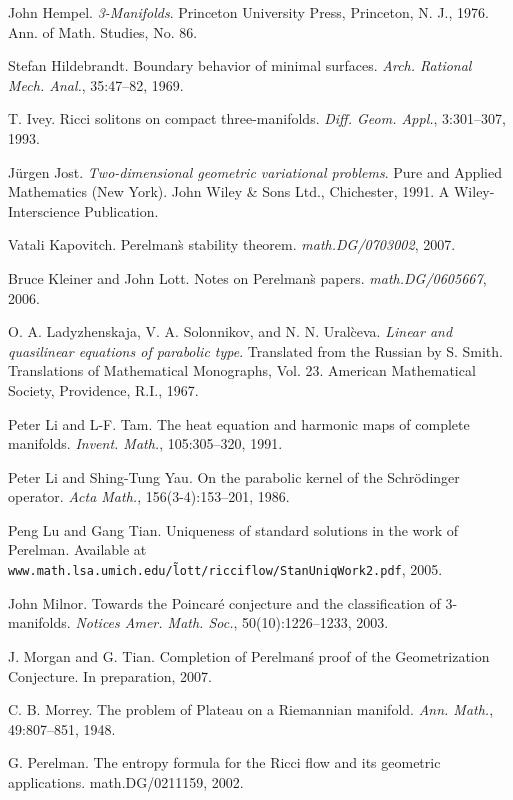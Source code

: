 \begin{thebibliography}{99}
    John Hempel. \textit{3-Manifolds}. Princeton University Press, Princeton, N. J., 1976. Ann. of Math. Studies, No. 86.

    Stefan Hildebrandt. Boundary behavior of minimal surfaces. \textit{Arch. Rational Mech. Anal.}, 35:47–82, 1969.

    T. Ivey. Ricci solitons on compact three-manifolds. \textit{Diff. Geom. Appl.}, 3:301–307, 1993.

    Jürgen Jost. \textit{Two-dimensional geometric variational problems}. Pure and Applied Mathematics (New York). John Wiley \& Sons Ltd., Chichester, 1991. A Wiley-Interscience Publication.

    Vatali Kapovitch. Perelman\`s stability theorem. \textit{math.DG/0703002}, 2007.

    Bruce Kleiner and John Lott. Notes on Perelman\`s papers. \textit{math.DG/0605667}, 2006.

    O. A. Ladyzhenskaja, V. A. Solonnikov, and N. N. Ural\`ceva. \textit{Linear and quasilinear equations of parabolic type}. Translated from the Russian by S. Smith. Translations of Mathematical Monographs, Vol. 23. American Mathematical Society, Providence, R.I., 1967.

    Peter Li and L-F. Tam. The heat equation and harmonic maps of complete manifolds. \textit{Invent. Math.}, 105:305–320, 1991.

    Peter Li and Shing-Tung Yau. On the parabolic kernel of the Schrödinger operator. \textit{Acta Math.}, 156(3-4):153–201, 1986.

    Peng Lu and Gang Tian. Uniqueness of standard solutions in the work of Perelman. Available at \texttt{www.math.lsa.umich.edu/\~lott/ricciflow/StanUniqWork2.pdf}, 2005.

    John Milnor. Towards the Poincaré conjecture and the classification of 3-manifolds. \textit{Notices Amer. Math. Soc.}, 50(10):1226–1233, 2003.

    J. Morgan and G. Tian. Completion of Perelman\'s proof of the Geometrization Conjecture. In preparation, 2007.

    C. B. Morrey. The problem of Plateau on a Riemannian manifold. \textit{Ann. Math.}, 49:807–851, 1948.

    G. Perelman. The entropy formula for the Ricci flow and its geometric applications. math.DG/0211159, 2002.


\end{thebibliography}
